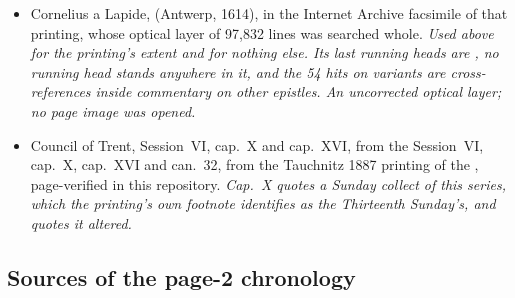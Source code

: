 \begin{itemize}[leftmargin=1.2em, itemsep=0.15em]
{record marks unestablished: the Latin lemmata and the words at issue are quoted
above and the translator's English is not, and the Latin original of the letter
was not opened.}
\fi
\ifdefined\TriptychSynthesisEdition\else
\item Cornelius a Lapide, 
(Antwerp, 1614), in the Internet Archive facsimile of that printing, whose
optical layer of 97,832 lines was searched whole. \textit{Used above for the
printing's extent and for nothing else. Its last running heads are
, no  running head stands
anywhere in it, and the 54 hits on  variants are cross-references
inside commentary on other epistles. An uncorrected optical layer; no page image
was opened.}
\fi
\item Council of Trent,
\ifdefined\TriptychSynthesisEdition
Session~VI, cap.~X and cap.~XVI, from the
\else
Session~VI, cap.~X, cap.~XVI and can.~32, from the
\fi
Tauchnitz 1887 printing of the , page-verified in this
repository. \textit{Cap.~X quotes a Sunday collect of this
series, which the printing's own footnote identifies as the Thirteenth Sunday's,
and quotes it altered.}
\end{itemize}

\subsection*{Sources of the page-2 chronology}


